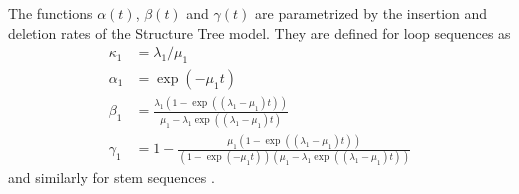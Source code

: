 \documentclass[10pt]{article}
\begin{document}
The functions $\alpha(t)$, $\beta(t)$ and $\gamma(t)$ are parametrized by the insertion and deletion rates of the Structure Tree model.
They are defined for loop sequences as
\begin{align}
  \kappa_1 &= \lambda_1 / \mu_1 \\
  \alpha_1 &= \exp \left( -\mu_1 t \right) \\
  \beta_1 &= \frac{\lambda_1 \left( 1 - \exp \left((\lambda_1 - \mu_1) t \right) \right)}{\mu_1 - \lambda_1 \exp \left( (\lambda_1 - \mu_1) t \right) } \\
  \gamma_1 &= 1 - \frac{\mu_1 \left( 1 - \exp \left((\lambda_1 - \mu_1) t \right) \right)}{\left( 1 - \exp (- \mu_1 t) \right) \left(\mu_1 - \lambda_1 \exp \left( (\lambda_1 - \mu_1) t \right) \right) }
\end{align}
and similarly for stem sequences \cite{Holmes2004}.



\end{document}
